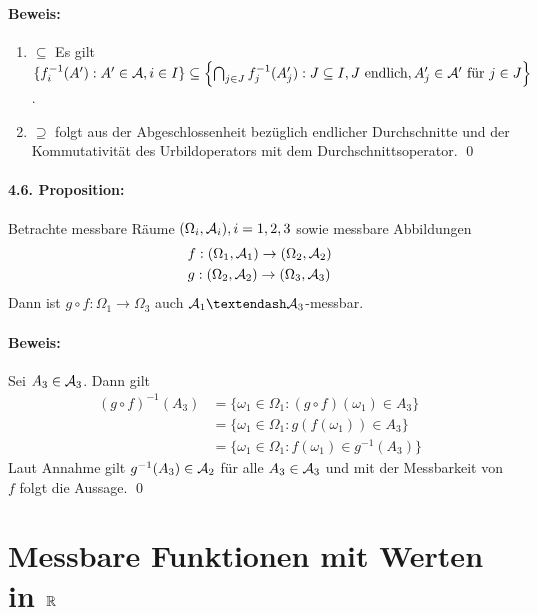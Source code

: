  \paragraph{Beweis:}
 \begin{enumerate}[label=\Roman*.]
     \item $\subseteq$\newline
     Es gilt $\{f_i^{-1}(A'):A'\in\mathcal{A}, i\in I\}\subseteq\left\{\bigcap_{j\in J}f_j^{-1}(A_j'):J\subseteq I, J\text{ endlich},A_j'\in\mathcal{A}'\text{ f\"ur }j\in J\right\}$.
     \item $\supseteq$\newline
     folgt aus der Abgeschlossenheit bez\"uglich endlicher Durchschnitte und der Kommutativit\"at des Urbildoperators mit dem Durchschnittsoperator. \qed
 \end{enumerate}
 
 \paragraph{4.6. Proposition:}Betrachte messbare R\"aume $(\Omega_i,\mathcal{A}_i),i=1,2,3$ sowie messbare Abbildungen 
 \begin{align*}
     &f:(\Omega_1,\mathcal{A}_1)\to(\Omega_2,\mathcal{A}_2)\\
     &g:(\Omega_2,\mathcal{A}_2)\to(\Omega_3,\mathcal{A}_3)
 \end{align*} 
 Dann ist $g\circ f:\Omega_1\to\Omega_3$ auch $\A_1\textendash\A_3$-messbar.
 
 \paragraph{Beweis:}Sei $A_3\in\mathcal{A}_3$. Dann gilt
 \begin{align*}
     (g\circ f)^{-1}(A_3)&=\{\omega_1\in\Omega_1:(g\circ f)(\omega_1)\in A_3\}\\
     &=\{\omega_1\in\Omega_1:g(f(\omega_1))\in A_3\}\\
     &=\{\omega_1\in\Omega_1:f(\omega_1)\in g^{-1}(A_3)\}
 \end{align*}
 Laut Annahme gilt $g^{-1}(A_3)\in\mathcal{A}_2$ f\"ur alle $A_3\in\mathcal{A}_3$ und mit der Messbarkeit von $f$ folgt die Aussage. \qed
 
 \section*{Messbare Funktionen mit Werten in $\mathbb{R}$}
 
